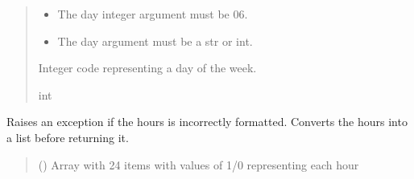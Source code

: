 \documentclass[letterpaper,10pt,english]{sphinxmanual}
\begin{document}
\begin{fulllineitems}
\begin{fulllineitems}
\begin{quote}
\begin{description}
\begin{itemize}
\item {} 
\sphinxAtStartPar
{} \textendash{} The day integer argument must be 0\sphinxhyphen{}6.

\item {} 
\sphinxAtStartPar
{} \textendash{} The day argument must be a str or int.

\end{itemize}

\sphinxAtStartPar
Integer code representing a day of the week.

\sphinxAtStartPar
int

\end{description}\end{quote}

\end{fulllineitems}


\begin{fulllineitems}
\label{\detokenize{PodDevice_8229:PodDevice_8229.POD_8229._Validate_Hours}}
\pysigstartsignatures
{}
\pysigstopsignatures
\sphinxAtStartPar
Raises an exception if the hours is incorrectly formatted. Converts the hours         into a list before returning it.
\begin{quote}\begin{description}
\sphinxAtStartPar
{} (\sphinxstyleliteralemphasis{\sphinxupquote{ | }}\sphinxstyleliteralemphasis{\sphinxupquote{{[}}}\sphinxstyleliteralemphasis{\sphinxupquote{ | }}\sphinxstyleliteralemphasis{\sphinxupquote{{]}}}) \textendash{} Array with 24 items with values of 1/0                 representing each hour


\end{description}
\end{quote}
\end{fulllineitems}
\end{fulllineitems}
\end{document}

